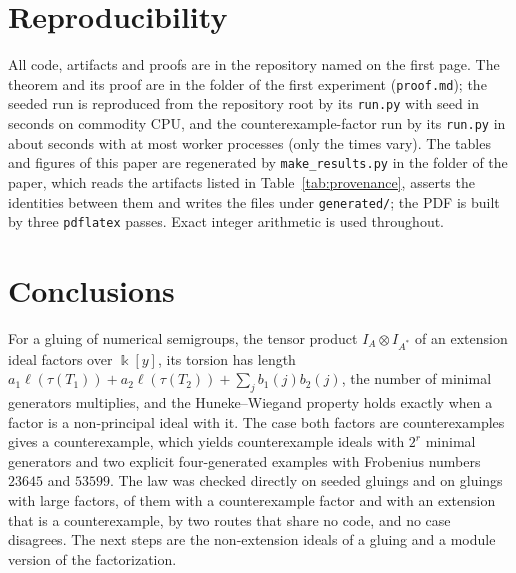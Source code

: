 \documentclass[11pt]{article}
\theoremstyle{definition}
\theoremstyle{remark}
\newcommand{\kk}{\Bbbk}
\newcommand{\tor}{\tau}
\newcommand{\len}{\ell}
\begin{document}
\section{Reproducibility}\label{sec:reproducibility}

All code, artifacts and proofs are in the repository named on the first page. The theorem and its proof are in the folder of the first experiment (\texttt{proof.md}); the seeded run is reproduced from the repository root by its
\texttt{run.py} with seed \Seed{} in \SeededSeconds{} seconds on commodity CPU, and the counterexample-factor run by its \texttt{run.py} in about \HardWall{} seconds with at most \HardWorkers{} worker processes (only the times vary). The tables and figures of this paper
are regenerated by \texttt{make\_results.py} in the folder of the paper, which reads the artifacts listed in Table~\ref{tab:provenance}, asserts the identities between them and writes the files under \texttt{generated/}; the PDF is built by three \texttt{pdflatex} passes.
Exact integer arithmetic is used throughout.

\begin{table}[t]
\centering\footnotesize

\caption{Code and artifact files behind the results, with the SHA-256 of each committed file: the producer library and its tests, the drivers and independent auditors of both experiments, and the results and logs from which every table and figure is generated.}\label{tab:provenance}
\end{table}

\section{Conclusions}\label{sec:conclusions}

For a gluing of numerical semigroups, the tensor product $I_A\otimes I_{A^*}$ of an extension ideal factors over $\kk[y]$, its torsion has length $a_1\len(\tor(T_1))+a_2\len(\tor(T_2))+\sum_jb_1(j)b_2(j)$, the number of minimal generators multiplies, and the
Huneke--Wiegand property holds exactly when a factor is a non-principal ideal with it. The case both factors are counterexamples gives a counterexample, which yields counterexample ideals with $2^r$ minimal generators and two explicit four-generated examples with Frobenius numbers $23645$ and $53599$.
The law was checked directly on \NSeeded{} seeded gluings and on \NHard{} gluings with large factors, \NHardCE{} of them with a counterexample factor and \NHardCEItself{} with an extension that is a counterexample, by two routes that share no code, and no case disagrees. The next steps are the non-extension ideals of a gluing and a module version of the factorization.
\end{document}
